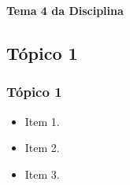 {
  \begin{frame}[plain]%

    \vfill
    \centering

    \begin{block}{}
      \centering{}
      \Huge{\textbf{Tema 4 da Disciplina}}
    \end{block}

    \vfill

  \end{frame}
} %



\subsection[Tópico 1]{Tópico 1}\label{subsec:tema-4-topico1}



\begin{frame}[t]\frametitle{Tópico 1}

  \begin{itemize}
    \justifying{}
    \setlength\itemsep{1em}
    \item Item 1.
    \item Item 2.
    \item Item 3.
  \end{itemize}

\end{frame}



